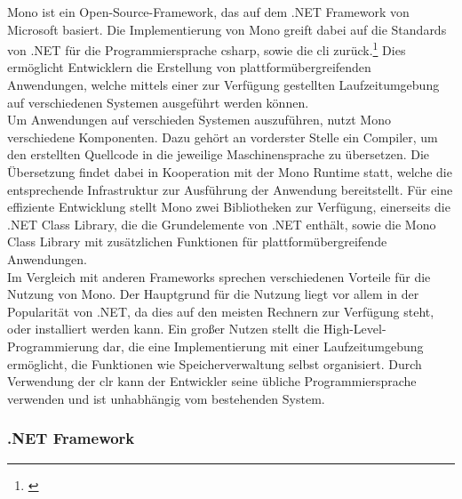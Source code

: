 Mono ist ein Open-Source-Framework, das auf dem .NET Framework von Microsoft basiert. Die Implementierung von Mono greift dabei auf die Standards von .NET für die Programmiersprache \gls{csharp}, sowie die \gls{cli} zurück.\footnote{\citep[vgl.][About Mono]{MonoProject.AboutMono}\label{note6x}} Dies ermöglicht Entwicklern die Erstellung von plattformübergreifenden Anwendungen, welche mittels einer zur Verfügung gestellten Laufzeitumgebung auf verschiedenen Systemen ausgeführt werden können.\\
Um Anwendungen auf verschieden Systemen auszuführen, nutzt Mono verschiedene Komponenten. Dazu gehört an vorderster Stelle ein Compiler, um den erstellten Quellcode in die jeweilige Maschinensprache zu übersetzen. Die Übersetzung findet dabei in Kooperation mit der Mono Runtime statt, welche die entsprechende Infrastruktur zur Ausführung der Anwendung bereitstellt. Für eine effiziente Entwicklung stellt Mono zwei Bibliotheken zur Verfügung, einerseits die .NET Class Library, die die Grundelemente von .NET enthält, sowie die Mono Class Library mit zusätzlichen Funktionen für plattformübergreifende Anwendungen.\\
Im Vergleich mit anderen Frameworks sprechen verschiedenen Vorteile für die Nutzung von Mono. Der Hauptgrund für die Nutzung liegt vor allem in der Popularität von .NET, da dies auf den meisten Rechnern zur Verfügung steht, oder installiert werden kann. Ein großer Nutzen stellt die High-Level-Programmierung dar, die eine Implementierung mit einer Laufzeitumgebung ermöglicht, die Funktionen wie Speicherverwaltung selbst organisiert. Durch Verwendung der \gls{clr} kann der Entwickler seine übliche Programmiersprache verwenden und ist unhabhängig vom bestehenden System.

\subsubsection{.NET Framework}\label{net}

